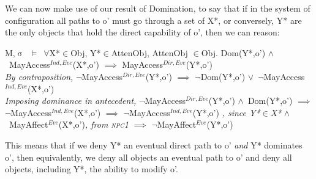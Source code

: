 \documentclass[a4paper,11pt, twoside,twocolumn]{article}
\newenvironment{logic}[1][]
{\begin{flushleft} \small }
{\end{flushleft}}
\newcommand{\loin}{$\in$}
\newcommand{\loforall}{$\forall$}
\newcommand{\loand}{$\land$}
\newcommand{\loor} {$\lor$}
\newcommand{\loimplies}{$\implies$}
\newcommand{\losigma}{$\upsigma$}
\newcommand{\loturns} {$\vDash$}
\newcommand{\loneg}{$\boldsymbol \neg$}
\newcommand{\ablock} {\null\qquad}
\begin{document}
We can now make use of our result of Domination, to say that if in the system of configuration all paths to o' must go through a set of X*, or conversely, Y* are the only objects that hold the direct capability of o', then we can reason:

\begin{logic} M,\losigma\ \loturns\ \loforall X*\loin Obj, Y*\loin AttenObj, AttenObj \loin Obj. \linebreak
\ablock \ablock Dom(Y*,o') \loand\ MayAccess$^{Ind,Eve}$(X*,o')\linebreak
\ablock \ablock \loimplies \linebreak
\ablock \ablock MayAccess$^{Dir,Eve}$(Y*,o')\linebreak\\

\textit{By contraposition,}\linebreak
\ablock \ablock \loneg MayAccess$^{Dir,Eve}$(Y*,o')\linebreak
\ablock \ablock \loimplies \linebreak
\ablock \ablock \loneg Dom(Y*,o') \loor\ \loneg MayAccess$^{Ind,Eve}$(X*,o')\linebreak\\

\textit{Imposing dominance in antecedent,}\linebreak
\ablock \ablock \loneg MayAccess$^{Dir,Eve}$(Y*,o') \loand\ Dom(Y*,o')\linebreak
\ablock \ablock \loimplies \linebreak
\ablock \ablock \loneg MayAccess$^{Ind,Eve}$(X*,o')\linebreak
\ablock \ablock \loimplies \linebreak
\ablock \ablock \loneg MayAccess$^{Ind,Eve}$(Y*,o') \textit{, since Y*\loin X*}\linebreak
\ablock \ablock \loand\ MayAffect$^{Eve}$(X*,o')\textit{, from \textsc{npc1}}\linebreak
\ablock \ablock \loimplies \linebreak
\ablock \ablock \loneg MayAffect$^{Eve}$(Y*,o')\linebreak
\end{logic}
This means that if we deny Y* an eventual direct path to o' \textit{and} Y* dominates o', then equivalently, we deny all objects an eventual path to o' and deny all objects, including Y*, the ability to modify o'.\\
\end{document}
